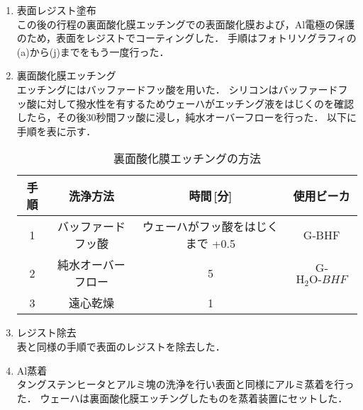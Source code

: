\documentclass[11pt]{jarticle}
\begin{document}
\begin{enumerate}
			\item 表面レジスト塗布\\
				この後の行程の裏面酸化膜エッチングでの表面酸化膜および，Al電極の保護のため，表面をレジストでコーティングした．
				手順はフォトリソグラフィの(a)から(j)までをもう一度行った．

			\item 裏面酸化膜エッチング\\
				エッチングにはバッファードフッ酸を用いた．
				シリコンはバッファードフッ酸に対して撥水性を有するためウェーハがエッチング液をはじくのを確認したら，その後30秒間フッ酸に浸し，純水オーバーフローを行った．
				以下に手順を表に示す．
				\begin{table}[H]
				\begin{center}
				\caption{裏面酸化膜エッチングの方法}
				\label{tab:uraetching}
				\begin{tabular}{c|ccc} \toprule
					手順&洗浄方法&時間\,[分]&使用ビーカ\\ \hline
					1&バッファードフッ酸&ウェーハがフッ酸をはじくまで +0.5&G‐BHF\\
					2&純水オーバーフロー&5&G‐$\mathrm{H_{2}O}‐BHF$\\
					3&遠心乾燥&1&\\ \bottomrule
				\end{tabular}
				\end{center}
				\end{table}

			\item レジスト除去\\
				表と同様の手順で表面のレジストを除去した．

			\item Al蒸着\\
				タングステンヒータとアルミ塊の洗浄を行い表面と同様にアルミ蒸着を行った．
				ウェーハは裏面酸化膜エッチングしたものを蒸着装置にセットした．
		\end{enumerate}
\end{document}

